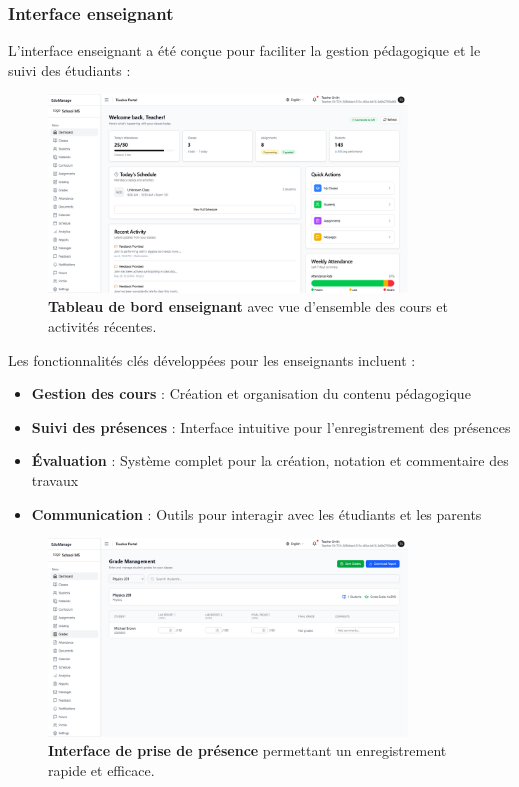 \subsubsection{Interface enseignant}

L'interface enseignant a été conçue pour faciliter la gestion pédagogique et le suivi des étudiants :

\begin{figure}[H]
  \centering
  \includegraphics[width=0.85\textwidth,keepaspectratio]{pfe-pics/teacher/Screenshot 2025-06-09 at 22-51-23 Vite React TS.png}
  \caption{\textbf{Tableau de bord enseignant} avec vue d'ensemble des cours et activités récentes.}
  \label{fig:teacher_dashboard}
\end{figure}

Les fonctionnalités clés développées pour les enseignants incluent :

\begin{itemize}
  \item \textbf{Gestion des cours} : Création et organisation du contenu pédagogique
  
  \item \textbf{Suivi des présences} : Interface intuitive pour l'enregistrement des présences
  
  \item \textbf{Évaluation} : Système complet pour la création, notation et commentaire des travaux
  
  \item \textbf{Communication} : Outils pour interagir avec les étudiants et les parents
\end{itemize}

\begin{figure}[H]
  \centering
  \includegraphics[width=0.85\textwidth,keepaspectratio]{pfe-pics/teacher/Screenshot 2025-06-09 at 22-53-59 Vite React TS.png}
  \caption{\textbf{Interface de prise de présence} permettant un enregistrement rapide et efficace.}
  \label{fig:attendance_taking}
\end{figure}

